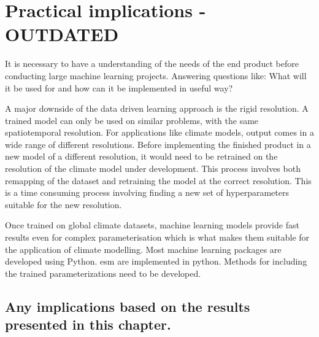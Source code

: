 \section{Practical implications - OUTDATED} \label{sec:practical_implications}
It is necessary to have a understanding of the needs of the end product before conducting large machine learning projects. Answering questions like: What will it be used for and how can it be implemented in useful way?

A major downside of the data driven learning approach is the rigid resolution. A trained model can only be used on similar problems, with the same spatiotemporal resolution. For applications like climate models, output comes in a wide range of different resolutions. Before implementing the finished product in a new model of a different resolution, it would need to be retrained on the resolution of the climate model under development. This process involves both remapping of the dataset and retraining the model at the correct resolution. This is a time consuming process involving finding a new set of hyperparameters suitable for the new resolution. %

Once trained on global climate datasets, machine learning models provide fast results even for complex parameterisation which is what makes them suitable for the application of climate modelling. Most machine learning packages are developed using Python. \acrfull{esm} are implemented in python. Methods for including the trained parameterizations need to be developed.
 
\subsection{Any implications based on the results presented in this chapter.}